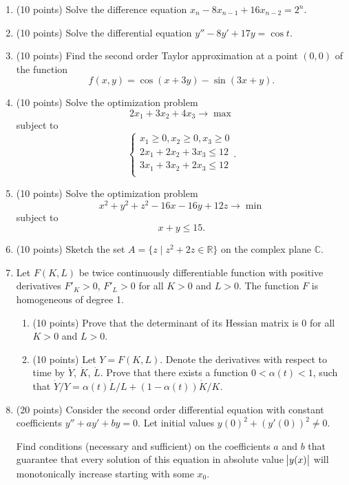 \begin{enumerate}
  \item (10 points) Solve the difference equation $x_n - 8 x_{n-1} + 16 x_{n-2} = 2^n$.

  \item (10 points) Solve the differential equation $y'' - 8 y' + 17 y = \cos t$.
\item (10 points) 
Find the second order Taylor approximation at a point $(0, 0)$ of the function 
\[
  f(x, y) = \cos(x + 3y) - \sin (3x + y).
\]

\item (10 points) Solve the optimization problem 
\[
2 x_1 + 3 x_2 + 4 x_3 \to \max  
\]
subject to
\[
\begin{cases}
x_1 \geq 0,  x_2 \geq 0, x_3 \geq 0  \\
2 x_1 + 2 x_2 + 3x_3 \leq 12 \\
3 x_1 + 3 x_2 + 2x_3 \leq 12 \\ 
\end{cases}.
\]

\item (10 points) Solve the optimization problem 
\[
x^2 + y^2 + z^2 - 16x - 16y + 12 z \to \min
\]
subject to
\[
x + y \leq 15. 
\]

\item (10 points) Sketch the set $A = \{z \mid z^2 + 2z \in \mathbb R\}$ on the complex plane $\mathbb C$.

\item Let $F(K, L)$ be twice continuously differentiable function with positive derivatives $F'_K >0$, $F'_L > 0$ for all $K > 0$ and $L > 0$. 
The function $F$ is homogeneous of degree 1.
\begin{enumerate}
    \item (10 points) Prove that the determinant of its Hessian matrix is 0 for all $K > 0$ and $L > 0$.
    \item (10 points) Let $Y = F(K, L)$. Denote the derivatives with respect to time by $\dot Y$, $\dot K$, $\dot L$. 
    Prove that there exists a function $0 < \alpha(t) < 1$, such that 
    $\dot Y/Y = \alpha(t) \dot L/L + (1-\alpha(t)) \dot K/K$.
\end{enumerate}


\item (20 points) Consider the second order differential equation with constant coefficients $y'' + a y' + by = 0$. 
Let initial values $y(0)^2 + (y'(0))^2 \neq 0$. 

Find conditions (necessary and sufficient) on the coefficients $a$ and $b$ 
that guarantee that every solution of this equation in absolute value $\abs{y(x)}$ 
will monotonically increase starting with some $x_0$.


\end{enumerate}

